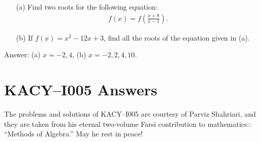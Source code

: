 \documentclass[12pt,a4paper]{memoir}
\theoremstyle{definition}
\begin{document}
	\setcounter{question}{116}
			


\begin{tcolorbox}
	\begin{question}
		\begin{itemize}
			\item[(a)] Find two roots for the following equation:
			\begin{align*}
				f(x)=f\left(\frac{x+8}{x-1}\right).
			\end{align*}
			\item[(b)] If $f(x)=x^2-12x+3$, find all the roots of the equation given in (a).
		\end{itemize}
	\end{question}
\end{tcolorbox}

\begin{solution}%
	Answer: (a) $x=-2, 4$, (b) $x=-2, 2, 4, 10$.
\end{solution}			
			
	\newpage
	\section*{KACY--I005 Answers}
	The problems and solutions of KACY--I005 are courtesy of Parviz Shahriari, and they are taken from his eternal two-volume Farsi contribution to mathematics:: ``Methods of Algebra.'' May he rest in peace!
	
	\vspace{1em}
	
	\printsolutions
\end{document}
